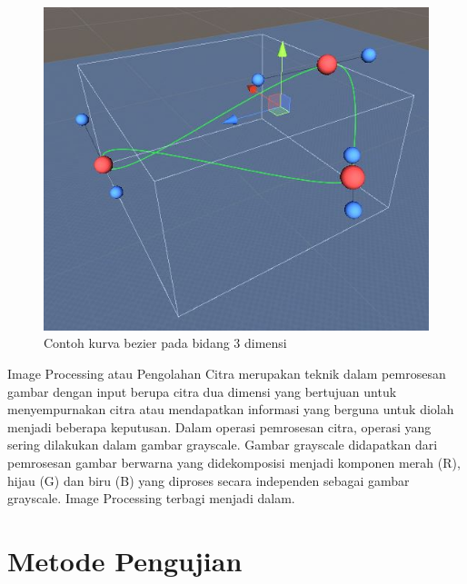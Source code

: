 \begin{figure} [H]
	\captionsetup{justification=centering}
	\includegraphics[scale=0.2]{img/contoh-kurva-bezier.JPG}
	\caption{Contoh kurva bezier pada bidang 3 dimensi}
	\label{fig:2.1}
\end{figure}

Image Processing atau Pengolahan Citra merupakan teknik
dalam pemrosesan gambar dengan input berupa citra dua dimensi yang bertujuan untuk menyempurnakan citra atau mendapatkan
informasi yang berguna untuk diolah menjadi beberapa keputusan. Dalam operasi pemrosesan citra, operasi yang sering dilakukan
dalam gambar grayscale. Gambar grayscale didapatkan dari pemrosesan gambar berwarna yang didekomposisi menjadi komponen
merah (R), hijau (G) dan biru (B) yang diproses secara independen
sebagai gambar grayscale. Image Processing terbagi menjadi dalam.
\vspace{1ex}

\section{Metode Pengujian}
\vspace{1ex}

